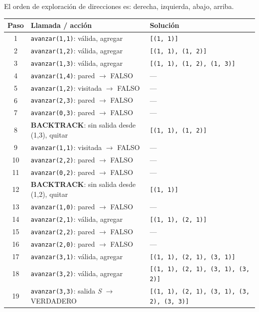 El orden de exploración de direcciones es: derecha, izquierda, abajo, arriba.

\begin{center}
\begin{tabular}{|c|l|l|}
\hline
\textbf{Paso} & \textbf{Llamada / acción} & \textbf{Solución} \\
\hline
1  & \texttt{avanzar(1,1)}: válida, agregar               & \texttt{[(1, 1)]} \\
2  & \texttt{avanzar(1,2)}: válida, agregar               & \texttt{[(1, 1), (1, 2)]} \\
3  & \texttt{avanzar(1,3)}: válida, agregar               & \texttt{[(1, 1), (1, 2), (1, 3)]} \\
4  & \texttt{avanzar(1,4)}: pared $\rightarrow$ FALSO     & — \\
5  & \texttt{avanzar(1,2)}: visitada $\rightarrow$ FALSO  & — \\
6  & \texttt{avanzar(2,3)}: pared $\rightarrow$ FALSO     & — \\
7  & \texttt{avanzar(0,3)}: pared $\rightarrow$ FALSO     & — \\
8  & \textbf{BACKTRACK}: sin salida desde (1,3), quitar   & \texttt{[(1, 1), (1, 2)]} \\
9  & \texttt{avanzar(1,1)}: visitada $\rightarrow$ FALSO  & — \\
10 & \texttt{avanzar(2,2)}: pared $\rightarrow$ FALSO     & — \\
11 & \texttt{avanzar(0,2)}: pared $\rightarrow$ FALSO     & — \\
12 & \textbf{BACKTRACK}: sin salida desde (1,2), quitar   & \texttt{[(1, 1)]} \\
13 & \texttt{avanzar(1,0)}: pared $\rightarrow$ FALSO     & — \\
14 & \texttt{avanzar(2,1)}: válida, agregar               & \texttt{[(1, 1), (2, 1)]} \\
15 & \texttt{avanzar(2,2)}: pared $\rightarrow$ FALSO     & — \\
16 & \texttt{avanzar(2,0)}: pared $\rightarrow$ FALSO     & — \\
17 & \texttt{avanzar(3,1)}: válida, agregar               & \texttt{[(1, 1), (2, 1), (3, 1)]} \\
18 & \texttt{avanzar(3,2)}: válida, agregar               & \texttt{[(1, 1), (2, 1), (3, 1), (3, 2)]} \\
19 & \texttt{avanzar(3,3)}: salida \textit{S} $\rightarrow$ VERDADERO & \texttt{[(1, 1), (2, 1), (3, 1), (3, 2), (3, 3)]} \\
\hline
\end{tabular}
\end{center}

